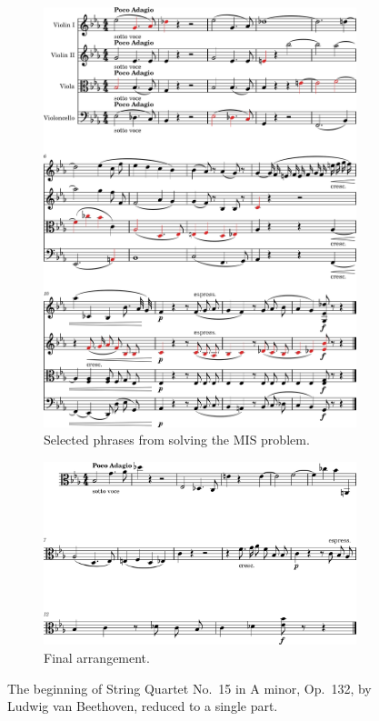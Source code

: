 \documentclass[aps,pra,12pt,onecolumn]{revtex4-2}
\begin{document}
\begin{figure}[h]
\begin{subfigure}[b]{0.5\linewidth}
        \includegraphics[width=0.95\linewidth]{../Figures/selected_trim-1.png}
        \caption{Selected phrases from solving the MIS problem.}
        \label{fig:selected}
    \end{subfigure}
    \par\bigskip
    \begin{subfigure}[t]{0.5\linewidth}
        \centering
        \includegraphics[width=\linewidth]{../Figures/arrangement_trim-1.png}
        \caption{Final arrangement.}
        \label{fig:arrangement}
    \end{subfigure}
    \caption{The beginning of String Quartet No.\ 15 in A minor, Op.\ 132, by Ludwig van Beethoven, reduced to a single part.}
    \label{fig:results}
\end{figure}
\end{document}
